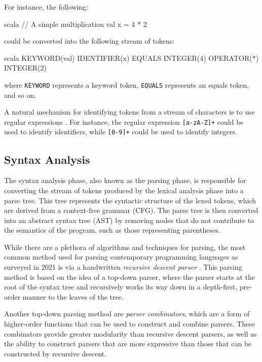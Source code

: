 For instance, the following:

\begin{code}{scala}
    // A simple multiplication
    val x = 4 * 2
\end{code}

\noindent could be converted into the following stream of tokens:

\begin{code}{scala}
    KEYWORD(val) IDENTIFIER(x) EQUALS INTEGER(4) OPERATOR(*) INTEGER(2)
\end{code}

\noindent where \texttt{KEYWORD} represents a keyword token,
\texttt{EQUALS} represents an equals token, and so on.

A natural mechanism for identifying tokens from a stream of characters is to use regular expressions
\autocite{aho2007compilers}. For instance, the regular expression \texttt{[a-zA-Z]+}
could be used to identify identifiers, while \texttt{[0-9]+} could be used to identify
integers.

\subsection{Syntax Analysis}

The syntax analysis phase, also known as the parsing phase, is responsible for converting the stream
of tokens produced by the lexical analysis phase into a parse tree. This tree represents the
syntactic structure of the lexed tokens, which are derived from a context-free grammar (CFG).
The parse tree is then converted into an abstract syntax tree (AST) by removing nodes that do not
contribute to the semantics of the program, such as those representing parentheses.

While there are a plethora of algorithms and techniques for parsing, the most common method used for
parsing contemporary programming languages as surveyed in 2021 is via a handwritten \emph{recursive
    descent parser} \autocite{eaton2021parser}. This parsing method is based on the idea of a top-down
parser, where the parser starts at the root of the syntax tree and recursively works its way down in
a depth-first, pre-order manner to the leaves of the tree.

Another top-down parsing method are \emph{parser combinators}, which are a form of higher-order
functions that can be used to construct and combine parsers. These combinators provide greater
modularity than recursive descent parsers, as well as the ability to construct parsers that are more
expressive than those that can be constructed by recursive descent.

